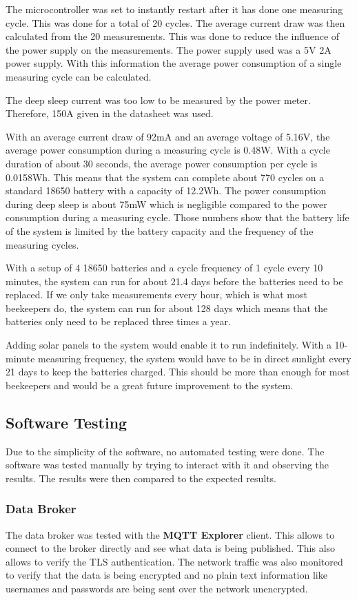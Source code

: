 The microcontroller was set to instantly restart after it has done one measuring cycle. This was done for a total of 20 cycles. The average current draw was then calculated from the 20 measurements. This was done to reduce the influence of the power supply on the measurements. The power supply used was a 5V 2A power supply. With this information the average power consumption of a single measuring cycle can be calculated.

The deep sleep current was too low to be measured by the power meter. Therefore, 150\mu A given in the datasheet \cite{espressif_esp32} was used. 

With an average current draw of 92mA and an average voltage of 5.16V, the average power consumption during a measuring cycle is 0.48W. With a cycle duration of about 30 seconds, the average power consumption per cycle is 0.0158Wh. This means that the system can complete about 770 cycles on a standard 18650 battery with a capacity of 12.2Wh. The power consumption during deep sleep is about 75mW  which is negligible compared to the power consumption during a measuring cycle. Those numbers show that the battery life of the system is limited by the battery capacity and the frequency of the measuring cycles.

With a setup of 4 18650 batteries and a cycle frequency of 1 cycle every 10 minutes, the system can run for about 21.4 days before the batteries need to be replaced. If we only take measurements every hour, which is what most beekeepers do, the system can run for about 128 days which means that the batteries only need to be replaced three times a year.

Adding solar panels to the system would enable it to run indefinitely. With a 10-minute measuring frequency, the system would have to be in direct sunlight every 21 days to keep the batteries charged. This should be more than enough for most beekeepers and would be a great future improvement to the system.


\subsection{Software Testing}
Due to the simplicity of the software, no automated testing were done. The software was tested manually by trying to interact with it and observing the results. The results were then compared to the expected results.

\subsubsection{Data Broker}
The data broker was tested with the \textbf{MQTT Explorer} client. This allows to connect to the broker directly and see what data is being published. This also allows to verify the TLS authentication. The network traffic was also monitored to verify that the data is being encrypted and no plain text information like usernames and passwords are being sent over the network unencrypted.

